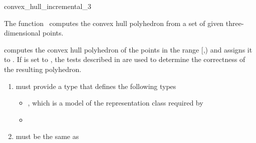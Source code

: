 

\begin{ccRefFunction}{convex_hull_incremental_3}  

\ccDefinition
  
The function \ccRefName\ computes the convex hull polyhedron from a set
of given three-dimensional points.  



            {computes the convex hull polyhedron 
            of the points in the range [,)
            and assigns it to .  If  is set to
            , the tests described in \cite{mnssssu-cgpvg-96} are
            used to determine the correctness of the resulting polyhedron.
            }

\begin{enumerate}
   \item    {} must provide a type 
            that defines the following types
             \begin{itemize}
               \item {}, which is a model of 
                     the representation class  required by
               \item {}
             \end{itemize}
   \item    {} must be the same as
\end{enumerate}


\end{ccRefFunction}
